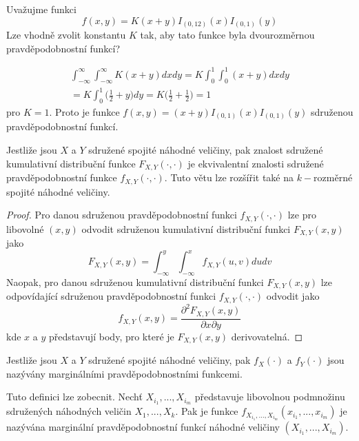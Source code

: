 \begin{example}
Uvažujme funkci
\begin{equation*}
f(x,y) = K(x + y)I_{(0, 12)}(x)I_{(0,1)}(y)
\end{equation*}
Lze vhodně zvolit konstantu $K$ tak, aby tato funkce byla dvourozměrnou pravděpodobnostní funkcí?

\begin{gather*}
\int_{-\infty}^{\infty} \int_{-\infty}^{\infty} K(x + y)dx dy = K \int_0^1 \int_0^1 (x + y)dx dy\\
=K \int_0^1 \big(\frac{1}{2} + y \big)dy = K \big(\frac{1}{2} + \frac{1}{2} \big) = 1
\end{gather*}
pro $K = 1$. Proto je funkce $f(x,y) = (x + y) I_{(0,1)}(x)I_{(0,1)}(y)$ sdruženou pravděpodobnostní funkcí.
\end{example}

\begin{theorem}
Jestliže jsou $X$ a $Y$ sdružené spojité náhodné veličiny, pak znalost sdružené kumulativní distribuční funkce $F_{X,Y}(\cdot, \cdot)$ je ekvivalentní znalosti sdružené pravděpodobnostní funkce $f_{X,Y}(\cdot, \cdot)$. Tuto větu lze rozšířit také na $k-$rozměrné spojité náhodné veličiny.
\end{theorem}
\begin{proof}
Pro danou sdruženou pravděpodobnostní funkci $f_{X,Y}(\cdot, \cdot)$ lze pro libovolné $(x,y)$ odvodit sdruženou kumulativní distribuční funkci $F_{X,Y}(x,y)$ jako
\begin{equation*}
F_{X,Y}(x,y) = \int_{-\infty}^y \int_{-\infty}^x f_{X,Y}(u,v)du dv
\end{equation*}
Naopak, pro danou sdruženou kumulativní distribuční funkci $F_{X,Y}(x,y)$ lze odpovídající sdruženou pravděpodobnostní funkci $f_{X,Y}(\cdot, \cdot)$ odvodit jako
\begin{equation*}
f_{X,Y}(x,y) = \frac{\partial^2 F_{X,Y}(x,y)}{\partial x \partial y}
\end{equation*}
kde $x$ a $y$ představují body, pro které je $F_{X,Y}(x,y)$ derivovatelná.
\end{proof}

\begin{definition}
Jestliže jsou $X$ a $Y$ sdružené spojité náhodné veličiny, pak $f_X(\cdot)$ a $f_Y(\cdot)$ jsou nazývány marginálními pravděpodobnostními funkcemi.

Tuto definici lze zobecnit. Nechť $X_{i_1}, ..., X_{i_m}$ představuje libovolnou podmnožinu sdružených náhodných veličin $X_1, ..., X_k$. Pak je funkce $f_{X_{i_1}, ..., X_{i_m}}(x_{i_1}, ..., x_{i_m})$ je nazývána marginální pravděpodobnostní funkcí náhodné veličiny $(X_{i_1}, ..., X_{i_m})$.
\end{definition}

